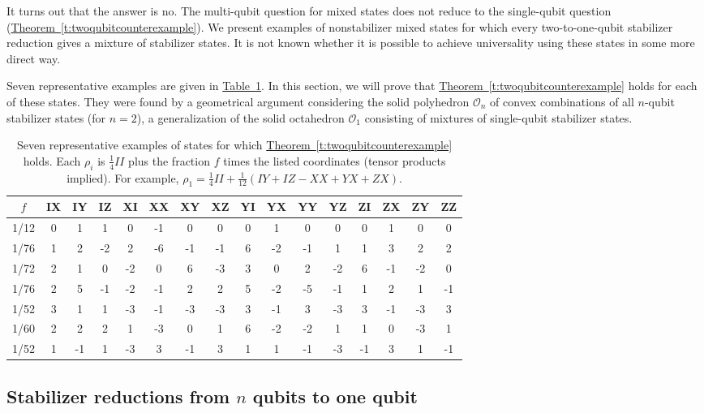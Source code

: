 \documentclass[11pt]{article}
\theoremstyle{note}
\newcommand{\thmref}[1]{\hyperref[#1]{{Theorem~\ref*{#1}}}}
\newcommand{\tabref}[1]{\hyperref[#1]{{Table~\ref*{#1}}}}
\begin{document}
It turns out that the answer is no.  The multi-qubit question for mixed states does not reduce to the single-qubit question (\thmref{t:twoqubitcounterexample}).  We present examples of nonstabilizer mixed states for which every two-to-one-qubit stabilizer reduction gives a mixture of stabilizer states.  It is not known whether it is possible to achieve universality using these states in some more direct way.

Seven representative examples are given in \tabref{f:counterexamples}.  In this section, we will prove that \thmref{t:twoqubitcounterexample} holds for each of these states.  They were found by a geometrical argument considering the solid polyhedron $\mathcal O_n$ of convex combinations of all $n$-qubit stabilizer states (for $n=2$), a generalization of the solid octahedron $\mathcal O_1$ consisting of mixtures of single-qubit stabilizer states.

\begin{table}
\caption{Seven representative examples of states for which \thmref{t:twoqubitcounterexample} holds.  Each $\rho_i$ is $\tfrac{1}{4}II$ plus the fraction $f$ times the listed coordinates (tensor products implied).  For example, $\rho_1 = \tfrac{1}{4} II + \tfrac{1}{12} (IY + IZ - XX + YX + ZX)$.}\label{f:counterexamples}
\centering
\begin{tabular}{c | c @{\quad} c @{\quad} c @{\quad} c @{\quad} c @{\quad} c @{\quad} c @{\quad} c @{\quad} c @{\quad} c @{\quad} c @{\quad} c @{\quad} c @{\quad} c @{\quad} c}
\hline \hline 
$f$ & IX& IY& IZ& XI& XX& XY& XZ& YI& YX& YY& YZ& ZI& ZX& ZY& ZZ\\
\hline
1/12& 0 & 1 & 1 & 0 &-1 & 0 & 0 & 0 & 1 & 0 & 0 & 0 & 1 & 0 & 0 \\
1/76& 1 & 2 &-2 & 2 &-6 &-1 &-1 & 6 &-2 &-1 & 1 & 1 & 3 & 2 & 2 \\
1/72& 2 & 1 & 0 &-2 & 0 & 6 &-3 & 3 & 0 & 2 &-2 & 6 &-1 &-2 & 0 \\
1/76& 2 & 5 &-1 &-2 &-1 & 2 & 2 & 5 &-2 &-5 &-1 & 1 & 2 & 1 &-1 \\
1/52& 3 & 1 & 1 &-3 &-1 &-3 &-3 & 3 &-1 & 3 &-3 & 3 &-1 &-3 & 3 \\
1/60& 2 & 2 & 2 & 1 &-3 & 0 & 1 & 6 &-2 &-2 & 1 & 1 & 0 &-3 & 1 \\
1/52& 1 &-1 & 1 &-3 & 3 &-1 & 3 & 1 & 1 &-1 &-3 &-1 & 3 & 1 &-1 \\
\hline \hline
\end{tabular}
\end{table}


\subsection{Stabilizer reductions from $n$ qubits to one qubit}
\end{document}

